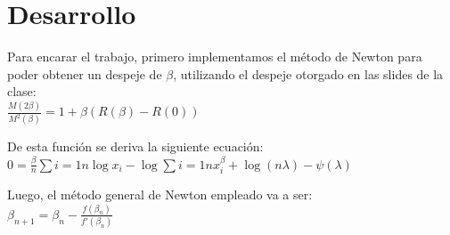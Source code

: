 \section{Desarrollo}
Para encarar el trabajo, primero implementamos el m\'etodo de Newton para poder obtener un despeje de $\beta$, utilizando el despeje otorgado en las slides de la clase:\\

$\frac{M(2\beta)}{M^2(\beta)}=1 + \beta(R(\beta)-R(0))$

De esta funci\'on se deriva la siguiente ecuaci\'on: \\

$0 = \frac{\beta}{n}\sum{i=1}{n}\log x_i - \log \sum{i=1}{n}x_i^{\beta} + \log(n\lambda)-\psi(\lambda)$

Luego, el m\'etodo general de Newton empleado va a ser: \\

$\beta_{n+1} = \beta_{n} - \frac{f(\beta_{n})}{f'(\beta_{n})}$
